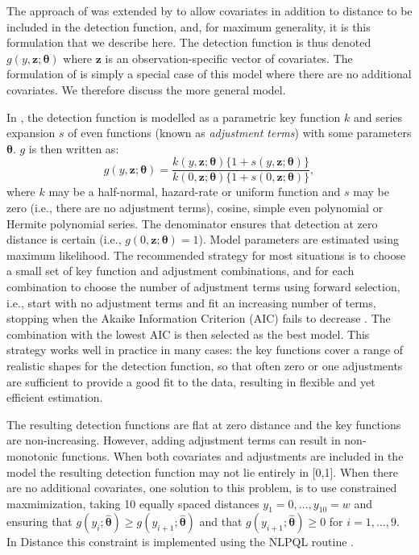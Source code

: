 \documentclass[useAMS,referee,usenatbib]{biom}
\begin{document}
The approach of \cite{Buckland:1992wy} was extended by \cite{Marques:2003vb} to allow covariates in addition to distance to be included in the detection function, and, for maximum generality, it is this formulation that we describe here.  The detection function is thus denoted $g(y, \mathbf{z};\bm{\theta})$ where $\mathbf{z}$ is an observation-specific vector of covariates.  The formulation of \cite{Buckland:1992wy} is simply a special case of this model where there are no additional covariates. We therefore discuss the more general model.

In \cite{Marques:2003vb}, the detection function is modelled as a parametric key function $k$ and series expansion $s$ of even functions (known as \textit{adjustment terms}) with some parameters $\bm{\theta}$. $g$ is then written as:
\begin{equation*}
g(y, \mathbf{z}; \bm{\theta}) = \frac{k(y, \mathbf{z}; \bm{\theta}) \{1+s(y, \mathbf{z}; \bm{\theta})\}}{k(0, \mathbf{z}; \bm{\theta}) \{1+s(0, \mathbf{z}; \bm{\theta})\}},
\end{equation*}
where $k$ may be a half-normal, hazard-rate or uniform function and $s$ may be zero (i.e., there are no adjustment terms), cosine, simple even polynomial or Hermite polynomial series. The denominator ensures that detection at zero distance is certain (i.e., $g(0, \mathbf{z};\bm{\theta})=1$). Model parameters are estimated using maximum likelihood.  The recommended strategy for most situations is to choose a small set of key function and adjustment combinations, and for each combination to choose the number of adjustment terms using forward selection, i.e., start with no adjustment terms and fit an increasing number of terms, stopping when the Akaike Information Criterion (AIC) fails to decrease  \citep[]{Thomas:2010cf}. The combination with the lowest AIC is then selected as the best model. This strategy works well in practice in many cases: the key functions cover a range of realistic shapes for the detection function, so that often zero or one adjustments are sufficient to provide a good fit to the data, resulting in flexible and yet efficient estimation. 

The resulting detection functions are flat at zero distance and the key functions are non-increasing. However, adding adjustment terms can result in non-monotonic functions. When both covariates and adjustments are included in the model the resulting detection function may not lie entirely in [0,1]. When there are no additional covariates, one solution to this problem, is to use constrained maxmimization, taking 10 equally spaced distances $y_1=0, \ldots , y_{10}=w$ and ensuring that $g(y_i;\bm{\hat{\theta}})\geq g(y_{i+1}; \bm{\hat{\theta}})$ and that $g(y_{i+1};\bm{\hat{\theta}})\geq 0$ for $i=1,\ldots,9$. In Distance this constraint is implemented using the NLPQL routine \cite[]{Schittkowski:1986wj}.
\end{document}

